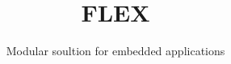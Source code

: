 \documentclass[12pt,a4paper,normalheadings,titlepage]{scrreprt}
\title{FLEX}
\subtitle{Modular soultion for embedded applications}
\author{}
\date{}
\begin{document}
\maketitle

\tableofcontents
\clearpage
\listoffigures
\clearpage
\listoftables
\clearpage

\onehalfspacing











\end{document}
